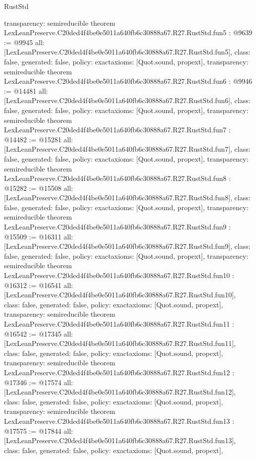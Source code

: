 \begin{lexlean}{RustStd}
\begin{coremodule}
{  transparency: semireducible
}
theorem LexLeanPreserve.C20ded4f4be0e5011a640fb6c30888a67.R27.RustStd.fun5 : @9639 := @9945 {
  all: [LexLeanPreserve.C20ded4f4be0e5011a640fb6c30888a67.R27.RustStd.fun5],
  class: false,
  generated: false,
  policy: exact{axioms: [Quot.sound, propext]},
  transparency: semireducible
}
theorem LexLeanPreserve.C20ded4f4be0e5011a640fb6c30888a67.R27.RustStd.fun6 : @9946 := @14481 {
  all: [LexLeanPreserve.C20ded4f4be0e5011a640fb6c30888a67.R27.RustStd.fun6],
  class: false,
  generated: false,
  policy: exact{axioms: [Quot.sound, propext]},
  transparency: semireducible
}
theorem LexLeanPreserve.C20ded4f4be0e5011a640fb6c30888a67.R27.RustStd.fun7 : @14482 := @15281 {
  all: [LexLeanPreserve.C20ded4f4be0e5011a640fb6c30888a67.R27.RustStd.fun7],
  class: false,
  generated: false,
  policy: exact{axioms: [Quot.sound, propext]},
  transparency: semireducible
}
theorem LexLeanPreserve.C20ded4f4be0e5011a640fb6c30888a67.R27.RustStd.fun8 : @15282 := @15508 {
  all: [LexLeanPreserve.C20ded4f4be0e5011a640fb6c30888a67.R27.RustStd.fun8],
  class: false,
  generated: false,
  policy: exact{axioms: [Quot.sound, propext]},
  transparency: semireducible
}
theorem LexLeanPreserve.C20ded4f4be0e5011a640fb6c30888a67.R27.RustStd.fun9 : @15509 := @16311 {
  all: [LexLeanPreserve.C20ded4f4be0e5011a640fb6c30888a67.R27.RustStd.fun9],
  class: false,
  generated: false,
  policy: exact{axioms: [Quot.sound, propext]},
  transparency: semireducible
}
theorem LexLeanPreserve.C20ded4f4be0e5011a640fb6c30888a67.R27.RustStd.fun10 : @16312 := @16541 {
  all: [LexLeanPreserve.C20ded4f4be0e5011a640fb6c30888a67.R27.RustStd.fun10],
  class: false,
  generated: false,
  policy: exact{axioms: [Quot.sound, propext]},
  transparency: semireducible
}
theorem LexLeanPreserve.C20ded4f4be0e5011a640fb6c30888a67.R27.RustStd.fun11 : @16542 := @17345 {
  all: [LexLeanPreserve.C20ded4f4be0e5011a640fb6c30888a67.R27.RustStd.fun11],
  class: false,
  generated: false,
  policy: exact{axioms: [Quot.sound, propext]},
  transparency: semireducible
}
theorem LexLeanPreserve.C20ded4f4be0e5011a640fb6c30888a67.R27.RustStd.fun12 : @17346 := @17574 {
  all: [LexLeanPreserve.C20ded4f4be0e5011a640fb6c30888a67.R27.RustStd.fun12],
  class: false,
  generated: false,
  policy: exact{axioms: [Quot.sound, propext]},
  transparency: semireducible
}
theorem LexLeanPreserve.C20ded4f4be0e5011a640fb6c30888a67.R27.RustStd.fun13 : @17575 := @17844 {
  all: [LexLeanPreserve.C20ded4f4be0e5011a640fb6c30888a67.R27.RustStd.fun13],
  class: false,
  generated: false,
  policy: exact{axioms: [Quot.sound, propext]},
}
\end{coremodule}
\end{lexlean}
